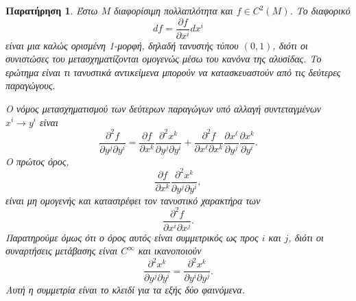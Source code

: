 \documentclass[11pt,a4paper,twoside,openright]{book}
\newtheorem{remark}[lemma]{Παρατήρηση}
\begin{document}
\begin{remark}
Έστω \(M\) διαφορίσιμη πολλαπλότητα και \(f \in C^2(M)\). Το διαφορικό
\begin{equation}
df = \frac{\partial f}{\partial x^i} dx^i
\end{equation}
είναι μια καλώς ορισμένη 1-μορφή, δηλαδή τανυστής τύπου \((0,1)\), διότι οι συνιστώσες του μετασχηματίζονται ομογενώς μέσω του κανόνα της αλυσίδας. Το ερώτημα είναι τι τανυστικά αντικείμενα μπορούν να κατασκευαστούν από τις δεύτερες παραγώγους.

Ο νόμος μετασχηματισμού των δεύτερων παραγώγων υπό αλλαγή συντεταγμένων \(x^i \to y^i\) είναι
\begin{equation}
\frac{\partial^2 f}{\partial y^j \partial y^i} = \frac{\partial f}{\partial x^k} \frac{\partial^2 x^k}{\partial y^j \partial y^i} + \frac{\partial^2 f}{\partial x^\ell \partial x^k} \frac{\partial x^\ell}{\partial y^j} \frac{\partial x^k}{\partial y^i}.
\end{equation}
Ο πρώτος όρος,
\begin{equation}
\frac{\partial f}{\partial x^k} \frac{\partial^2 x^k}{\partial y^j \partial y^i},
\end{equation}
είναι μη ομογενής και καταστρέφει τον τανυστικό χαρακτήρα των
\begin{equation}
\frac{\partial^2 f}{\partial x^i \partial x^j}.
\end{equation}
Παρατηρούμε όμως ότι ο όρος αυτός είναι συμμετρικός ως προς \(i\) και \(j\), διότι οι συναρτήσεις μετάβασης είναι \(C^\infty\) και ικανοποιούν
\begin{equation}
\frac{\partial^2 x^k}{\partial y^j \partial y^i} = \frac{\partial^2 x^k}{\partial y^i \partial y^j}.
\end{equation}
Αυτή η συμμετρία είναι το κλειδί για τα εξής δύο φαινόμενα.


\end{remark}
\end{document}
